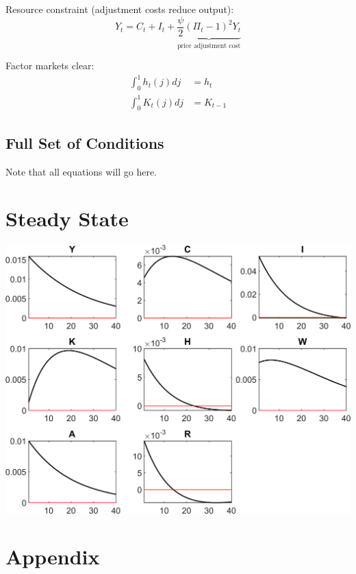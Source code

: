 \documentclass[11pt,preprint]{elsarticle}
\let\origfigure\figure
\let\endorigfigure\endfigure
\renewenvironment{figure}[1][2] {
    \expandafter\origfigure\expandafter[H]
} {
    \endorigfigure
}
\numberwithin{equation}{section}
\numberwithin{figure}{section}
\numberwithin{table}{section}
\begin{document}
Resource constraint (adjustment costs reduce output): \begin{equation}
Y_t = C_t + I_t + \underbrace{\frac{\psi}{2} (\Pi_t - 1)^2 Y_t}_{\text{price adjustment cost}}
\label{resource_constraint}
\end{equation}

Factor markets clear: \begin{align}
\int_0^1 h_t(j) dj &= h_t \\
\int_0^1 K_t(j) dj &= K_{t-1}
\end{align}

\subsection{Full Set of Conditions}\label{full-set-of-conditions}

Note that all equations will go here.

\section{Steady State}\label{steady-state}

\begin{figure}
\centering
\includegraphics{code/rbc_model/rbc_model/graphs/rbc_model_IRF_eps_cropped.png}
\caption{image}
\end{figure}

\newpage
\newpage

\section{Appendix}\label{appendix}
\end{document}
